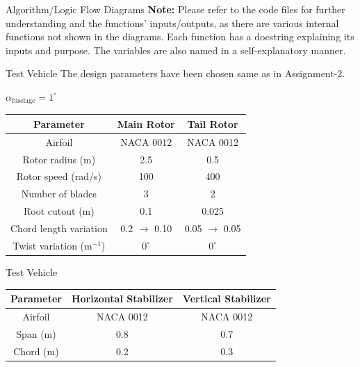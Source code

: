 \documentclass{beamer}
\begin{document}
\begin{frame}{Algorithm/Logic Flow Diagrams}
    \textbf{Note:}
    Please refer to the code files for further understanding and the functions' inputs/outputs, as there are various internal functions not shown in the diagrams. Each function has a docstring explaining its inputs and purpose. The variables are also named in a self-explanatory manner.

\end{frame}

\begin{frame}{Test Vehicle}
  The design parameters have been chosen same as in Assignment-2.
    \begin{center}
        $\alpha_\text{fuselage} = 1^\circ$
        \end{center}
        \begin{table}
            \centering
            \begin{tabular}{|c|c|c|}
            \hline
                \textbf{Parameter} & \textbf{Main Rotor} & \textbf{Tail Rotor} \\ \hline
                 Airfoil & NACA 0012 & NACA 0012\\ \hline
                 Rotor radius (m)& 2.5 & 0.5\\ \hline
                 Rotor speed (rad/s)& 100 & 400 \\ \hline
                 Number of blades & 3 & 2\\ \hline
                 Root cutout (m) & 0.1  & 0.025\\ \hline
                 Chord length variation & 0.2 $\to$ 0.10 & 0.05 $\to$ 0.05\\ \hline
                 Twist variation (m$^{-1}$) & $0^\circ$ & $0^\circ$\\ \hline
                 \hline
            \end{tabular}
        \end{table} 
\end{frame}

\begin{frame}{Test Vehicle}

  \begin{table}
    \centering
    \begin{tabular}{|c|c|c|}
      \hline
      \textbf{Parameter} & \textbf{Horizontal Stabilizer} & \textbf{Vertical Stabilizer} \\ \hline
      Airfoil & NACA 0012 & NACA 0012\\ \hline
      Span (m) & 0.8 & 0.7\\ \hline
      Chord (m) & 0.2 & 0.3\\ \hline
    \end{tabular}
  \end{table}

\end{frame}
\end{document}
